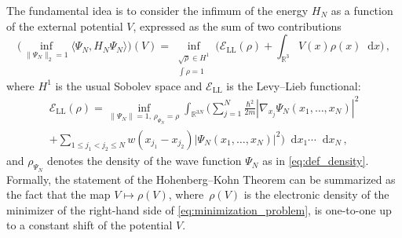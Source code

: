 \documentclass[12pt,a4paper]{amsart}
\numberwithin{equation}{section}
\newcommand*\diff{\mathop{}\!\mathrm{d}}
\begin{document}
	The fundamental idea is to consider the infimum of the energy $H_N$ as a function of the external potential $V$, expressed as the sum of two contributions
	\begin{equation}\label{eq:minimization_problem}
		\Big( \inf_{\| \Psi_N \|_2 =1} \langle \Psi_N, H_N \Psi_N \rangle \Big) (V) = \inf_{\substack{\sqrt{\rho} \in H^1 \\ \int\rho = 1}} \Big( \mathscr{E}_{\mathrm{LL}}(\rho) + \int_{\mathbb{R}^3} V(x) \rho(x) \diff  x  \Big)\, ,
	\end{equation}
	where $H^1$ is the usual Sobolev space and $ \mathscr{E}_{\mathrm{LL}} $ is the Levy–Lieb functional:	
	\begin{multline}
		\mathscr{E}_{\mathrm{LL}} (\rho) = \inf_{\| \Psi_N \|=1,\, \rho_{\Psi_N} = \rho}  \int_{\mathbb{R}^{3N}} \Big(\sum_{j=1}^N \frac{\hbar^2}{2m} | \nabla_{x_j} \Psi_N(x_1,\dots,x_N)|^2 \\
		+ \sum_{1\leq j_1<j_2\leq N} w(x_{j_1}-x_{j_2}) | \Psi_N(x_1,\dots,x_N)|^2 \Big)\diff x_1\cdots\diff x_N\, ,
	\end{multline}
	and $ \rho_{\Psi_N} $ denotes the density of the wave function $\Psi_N$ as in \eqref{eq:def_density}. Formally, the statement of the Hohenberg–Kohn Theorem can be summarized as the fact that the map $V \mapsto \rho(V) $, where~$\rho(V)$ is the electronic density of the minimizer of the right-hand side of \eqref{eq:minimization_problem}, is one-to-one up to a constant shift of the potential $V$.
	
\end{document}
